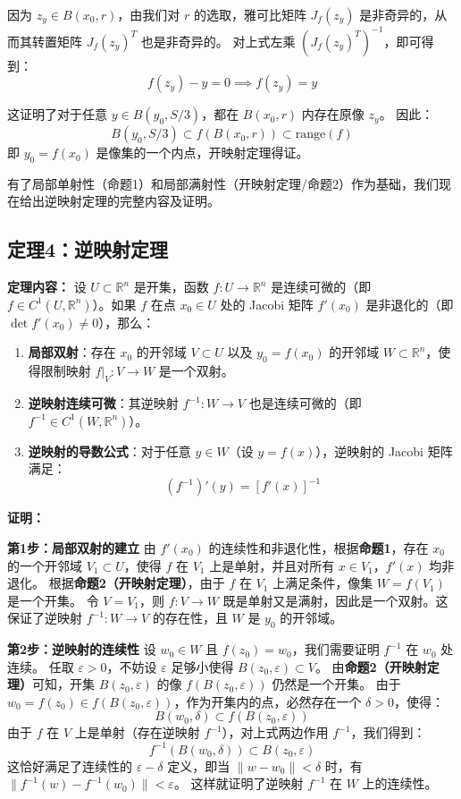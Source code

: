 \documentclass[12pt,a4paper]{ctexart}
\begin{document}
因为 $z_y \in B(x_0, r)$，由我们对 $r$ 的选取，雅可比矩阵 $J_f(z_y)$ 是非奇异的，从而其转置矩阵 $J_f(z_y)^T$ 也是非奇异的。
对上式左乘 $(J_f(z_y)^T)^{-1}$，即可得到：
\[
f(z_y) - y = 0 \implies f(z_y) = y
\]

这证明了对于任意 $y \in B(y_0, S/3)$，都在 $B(x_0, r)$ 内存在原像 $z_y$。
因此：
\[
B(y_0, S/3) \subset f(B(x_0, r)) \subset \text{range}(f)
\]
即 $y_0 = f(x_0)$ 是像集的一个内点，开映射定理得证。

有了局部单射性（命题1）和局部满射性（开映射定理/命题2）作为基础，我们现在给出逆映射定理的完整内容及证明。

\subsection*{定理4：逆映射定理}

\textbf{定理内容：}
设 $U \subset \mathbb{R}^n$ 是开集，函数 $f: U \to \mathbb{R}^n$ 是连续可微的（即 $f \in C^1(U, \mathbb{R}^n)$）。如果 $f$ 在点 $x_0 \in U$ 处的 Jacobi 矩阵 $f'(x_0)$ 是非退化的（即 $\det f'(x_0) \neq 0$），那么：
\begin{enumerate}[label=\arabic*.,leftmargin=2.5em]
\item \textbf{局部双射}：存在 $x_0$ 的开邻域 $V \subset U$ 以及 $y_0 = f(x_0)$ 的开邻域 $W \subset \mathbb{R}^n$，使得限制映射 $f|_V : V \to W$ 是一个双射。
\item \textbf{逆映射连续可微}：其逆映射 $f^{-1}: W \to V$ 也是连续可微的（即 $f^{-1} \in C^1(W, \mathbb{R}^n)$）。
\item \textbf{逆映射的导数公式}：对于任意 $y \in W$（设 $y = f(x)$），逆映射的 Jacobi 矩阵满足：
  \[
  (f^{-1})'(y) = [f'(x)]^{-1}
  \]
\end{enumerate}

\textbf{证明：}

\textbf{第1步：局部双射的建立}
由 $f'(x_0)$ 的连续性和非退化性，根据\textbf{命题1}，存在 $x_0$ 的一个开邻域 $V_1 \subset U$，使得 $f$ 在 $V_1$ 上是单射，并且对所有 $x \in V_1$，$f'(x)$ 均非退化。
根据\textbf{命题2（开映射定理）}，由于 $f$ 在 $V_1$ 上满足条件，像集 $W = f(V_1)$ 是一个开集。
令 $V = V_1$，则 $f: V \to W$ 既是单射又是满射，因此是一个双射。这保证了逆映射 $f^{-1}: W \to V$ 的存在性，且 $W$ 是 $y_0$ 的开邻域。

\textbf{第2步：逆映射的连续性}
设 $w_0 \in W$ 且 $f(z_0) = w_0$，我们需要证明 $f^{-1}$ 在 $w_0$ 处连续。
任取 $\varepsilon > 0$，不妨设 $\varepsilon$ 足够小使得 $B(z_0, \varepsilon) \subset V$。
由\textbf{命题2（开映射定理）}可知，开集 $B(z_0, \varepsilon)$ 的像 $f(B(z_0, \varepsilon))$ 仍然是一个开集。
由于 $w_0 = f(z_0) \in f(B(z_0, \varepsilon))$，作为开集内的点，必然存在一个 $\delta > 0$，使得：
\[
B(w_0, \delta) \subset f(B(z_0, \varepsilon))
\]
由于 $f$ 在 $V$ 上是单射（存在逆映射 $f^{-1}$），对上式两边作用 $f^{-1}$，我们得到：
\[
f^{-1}(B(w_0, \delta)) \subset B(z_0, \varepsilon)
\]
这恰好满足了连续性的 $\varepsilon-\delta$ 定义，即当 $\|w - w_0\| < \delta$ 时，有 $\|f^{-1}(w) - f^{-1}(w_0)\| < \varepsilon$。
这样就证明了逆映射 $f^{-1}$ 在 $W$ 上的连续性。
\end{document}
